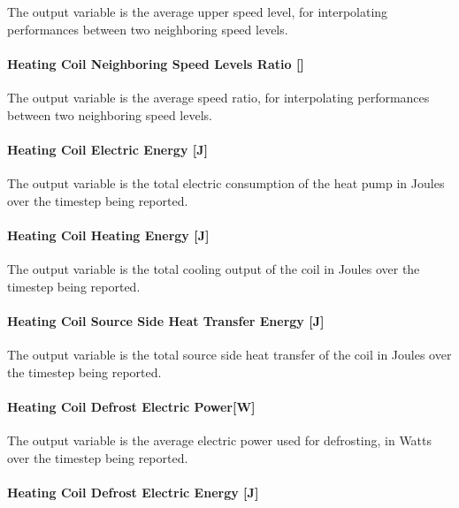 The output variable is the average upper speed level, for interpolating performances between two neighboring speed levels.

\paragraph{\texorpdfstring{Heating Coil Neighboring Speed Levels Ratio {[]}}{Heating Coil Neighboring Speed Levels Ratio }}\label{heating-coil-neighboring-speed-levels-ratio}

The output variable is the average speed ratio, for interpolating performances between two neighboring speed levels.

\paragraph{Heating Coil Electric Energy {[}J{]}}\label{heating-coil-electric-energy-j-4}

The output variable is the total electric consumption of the heat pump in Joules over the timestep being reported.

\paragraph{Heating Coil Heating Energy {[}J{]}}\label{heating-coil-heating-energy-j-2}

The output variable is the total cooling output of the coil in Joules over the timestep being reported.

\paragraph{Heating Coil Source Side Heat Transfer Energy {[}J{]}}\label{heating-coil-source-side-heat-transfer-energy-j-1}

The output variable is the total source side heat transfer of the coil in Joules over the timestep being reported.

\paragraph{Heating Coil Defrost Electric Power{[}W{]}}\label{heating-coil-defrost-electric-powerw}

The output variable is the average electric power used for defrosting, in Watts over the timestep being reported.

\paragraph{Heating Coil Defrost Electric Energy {[}J{]}}\label{heating-coil-defrost-electric-energy-j-2}

